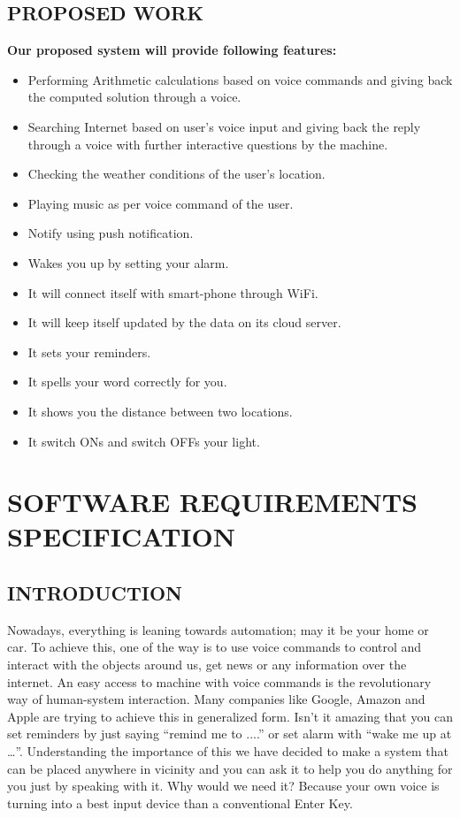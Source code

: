 \documentclass[12pt]{extreport}
\begin{document}
\section{PROPOSED WORK}
\textbf{Our proposed system will provide following features:}
\begin{itemize}
\item Performing Arithmetic calculations based on voice commands and giving back the computed solution through a voice.
\item Searching Internet based on user's voice input and giving back the reply through a voice with further interactive questions by the machine.
\item Checking the weather conditions of the user’s location.
\item Playing music as per voice command of the user.
\item Notify using push notification.
\item Wakes you up by setting your alarm.
\item It will connect itself with smart-phone through WiFi.
\item It will keep itself updated by the data on its cloud server.
\item It sets your reminders.
\item It spells your word correctly for you.
\item It shows you the distance between two locations.
\item It switch ONs and switch OFFs your light.
\end{itemize}



\chapter{SOFTWARE REQUIREMENTS SPECIFICATION}

\section{INTRODUCTION}
\hspace*{3em}Nowadays, everything is leaning towards automation; may it be your home or car. To achieve this, one of the way is to use voice commands to control and interact with the objects around us, get news or any information over the internet. An easy access to machine with voice commands is the revolutionary way of human-system interaction. Many companies like Google, Amazon and Apple are trying to achieve this in generalized form. Isn’t it amazing that you can set reminders by just saying “remind me to ....” or set alarm with “wake me up at …”. Understanding the importance of this we have decided to make a system that can be placed anywhere in vicinity and you can ask it to help you do anything for you just by speaking with it. Why would we need it? Because your own voice is turning into a best input device than a conventional Enter Key.\\
\noindent
\end{document}

